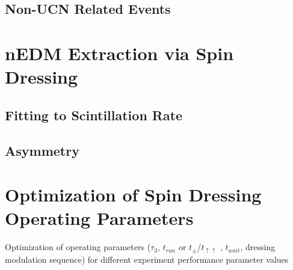 \subsection{Non-UCN Related Events}


\section{nEDM Extraction via Spin Dressing}

\subsection{Fitting to Scintillation Rate}

\subsection{Asymmetry}

\section{Optimization of Spin Dressing Operating Parameters}

Optimization of operating parameters ($\tau_3$, $t_{run}$ or $t_{\pm}$/$t_{\uparrow \uparrow}$ , $t_{wait}$, dressing modulation sequence) for different experiment performance parameter values

